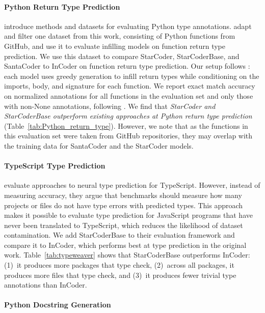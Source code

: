 \paragraph{Python Return Type Prediction}

\citet{pradel:typewriter} introduce methods and datasets for evaluating Python type annotations. \cite{fried2022incoder} adapt and filter one dataset from this work, consisting of Python functions from GitHub, and use it to evaluate infilling models on function return type prediction. We use this dataset to compare StarCoder, StarCoderBase, and SantaCoder to InCoder on function return type prediction. Our setup follows \citet{fried2022incoder}: each model uses greedy generation to infill return types while conditioning on the imports, body, and signature for each function. We report exact match accuracy on normalized annotations for all functions in the evaluation set and only those with non-None annotations, following \citet{fried2022incoder}. We find that \emph{StarCoder and StarCoderBase outperform existing approaches at Python return type prediction} (Table~\ref{tab:Python_return_type}).
However, we note that as the functions in this evaluation set were taken from GitHub repositories, they may overlap with the training data for SantaCoder and the StarCoder models.

\paragraph{TypeScript Type Prediction}

\cite{yee:typeweaver} evaluate approaches to neural type prediction for TypeScript. However, instead of measuring accuracy, they argue that benchmarks should measure how many projects or files do not have type errors with predicted types. This approach makes it possible to evaluate type prediction for JavaScript programs that have never been translated to TypeScript, which reduces the likelihood of dataset contamination. We add StarCoderBase to their evaluation framework and compare it to InCoder, which performs best at type prediction in the original work. Table~\ref{tab:typeweaver} shows that StarCoderBase outperforms InCoder: (1)~it produces more packages that type check, (2)~across all packages, it produces more files that type check, and (3)~it produces fewer trivial type annotations than InCoder.

\paragraph{Python Docstring Generation}

